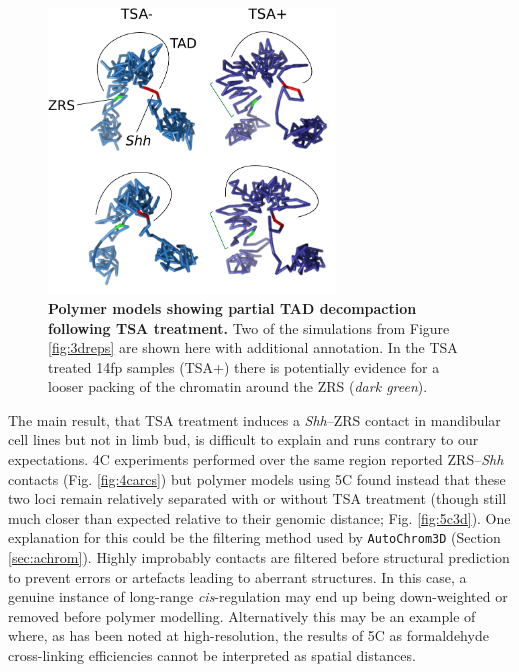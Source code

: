 \documentclass[a4paper,11pt,oneside]{book}
\begin{document}
\begin{figure}
\begin{center} 
\includegraphics[width=3in]{figs/decompaction.pdf}
\captionsetup{width=\textwidth} 
\caption[ Polymer models showing partial TAD decompaction following TSA treatment. ]{ {\bf Polymer models showing partial TAD decompaction following TSA treatment. }
Two of the simulations from Figure \ref{fig:3dreps} are shown here with additional annotation. In the TSA treated 14fp samples (TSA+) there is potentially evidence for a looser packing of the chromatin around the ZRS (\emph{dark green}).
}\label{fig:decompaction}
\end{center} 
\end{figure} 


The main result, that TSA treatment induces a \emph{Shh}--ZRS contact in mandibular cell lines but not in limb bud, is difficult to explain and runs contrary to our expectations. 4C experiments performed over the same region reported ZRS--\emph{Shh} contacts (Fig. \ref{fig:4carcs}) but polymer models using 5C found instead that these two loci remain relatively separated with or without TSA treatment (though still much closer than expected relative to their genomic distance; Fig. \ref{fig:5c3d}). One explanation for this could be the filtering method used by \texttt{AutoChrom3D} (Section \ref{sec:achrom}). Highly improbably contacts are filtered before structural prediction to prevent errors or artefacts leading to aberrant structures. In this case, a genuine instance of long-range \emph{cis}-regulation may end up being down-weighted or removed before polymer modelling. Alternatively this may be an example of where, as has been noted at high-resolution, the results of 5C as formaldehyde cross-linking efficiencies cannot be interpreted as spatial distances.\cite{Williamson2014}
\end{document}
